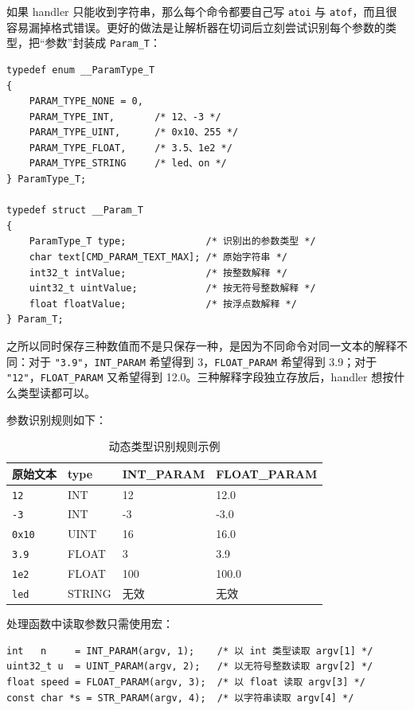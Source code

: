 如果 handler 只能收到字符串，那么每个命令都要自己写 \texttt{atoi} 与 \texttt{atof}，而且很容易漏掉格式错误。更好的做法是让解析器在切词后立刻尝试识别每个参数的类型，把“参数”封装成 \texttt{Param\_T}：

\begin{lstlisting}[style=c]
typedef enum __ParamType_T
{
    PARAM_TYPE_NONE = 0,
    PARAM_TYPE_INT,       /* 12、-3 */
    PARAM_TYPE_UINT,      /* 0x10、255 */
    PARAM_TYPE_FLOAT,     /* 3.5、1e2 */
    PARAM_TYPE_STRING     /* led、on */
} ParamType_T;

typedef struct __Param_T
{
    ParamType_T type;              /* 识别出的参数类型 */
    char text[CMD_PARAM_TEXT_MAX]; /* 原始字符串 */
    int32_t intValue;              /* 按整数解释 */
    uint32_t uintValue;            /* 按无符号整数解释 */
    float floatValue;              /* 按浮点数解释 */
} Param_T;
\end{lstlisting}

之所以同时保存三种数值而不是只保存一种，是因为不同命令对同一文本的解释不同：对于 \texttt{"3.9"}，\texttt{INT\_PARAM} 希望得到 3，\texttt{FLOAT\_PARAM} 希望得到 3.9；对于 \texttt{"12"}，\texttt{FLOAT\_PARAM} 又希望得到 12.0。三种解释字段独立存放后，handler 想按什么类型读都可以。

参数识别规则如下：

\begin{table}[htbp]
\centering \caption{动态类型识别规则示例} \label{tab:param-type}
    \begin{tabular}{llll}
        \toprule
        原始文本 & type & INT\_PARAM & FLOAT\_PARAM \\
        \midrule
        \texttt{12}      & INT   & 12        & 12.0 \\
        \texttt{-3}      & INT   & -3        & -3.0 \\
        \texttt{0x10}    & UINT  & 16        & 16.0 \\
        \texttt{3.9}     & FLOAT & 3         & 3.9 \\
        \texttt{1e2}     & FLOAT & 100       & 100.0 \\
        \texttt{led}     & STRING & 无效      & 无效 \\
        \bottomrule
    \end{tabular}
\end{table}

处理函数中读取参数只需使用宏：

\begin{lstlisting}[style=c]
int   n     = INT_PARAM(argv, 1);    /* 以 int 类型读取 argv[1] */
uint32_t u  = UINT_PARAM(argv, 2);   /* 以无符号整数读取 argv[2] */
float speed = FLOAT_PARAM(argv, 3);  /* 以 float 读取 argv[3] */
const char *s = STR_PARAM(argv, 4);  /* 以字符串读取 argv[4] */
\end{lstlisting}

